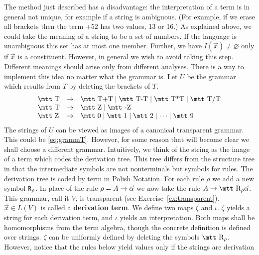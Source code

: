 The method just described has a disadvantage: the interpretation
of a term is in general not unique, for example if a string is
ambiguous. (For example, if we erase all brackets then the
term {+52} has two values, 13 or 16.) As explained
above, we could take the meaning of a string to be a set of numbers.
If the language is unambiguous this set has at most one member.
Further, we have $I(\vec{x}) \neq \varnothing$ only if $\vec{x}$
is a constituent. However, in general we wish to avoid taking this
step. Different meanings should arise only from different
analyses. There is a way to implement this idea no matter what the
grammar is. Let $U$ be the grammar which results from $T$ by
deleting the brackets of $T$.
\begin{equation}
\begin{array}{l@{\quad \pf\quad}l}
\mbox{\mtt T} & \mbox{\mtt T+T} \mid \mbox{\mtt T-T} \mid
    \mbox{\mtt T\symbol{42}T} \mid
    \mbox{\mtt T\symbol{47}T} \\
\mbox{\mtt T} & \mbox{\mtt Z} \mid \mbox{\mtt -Z} \\
\mbox{\mtt Z} & \mbox{\mtt 0} \mid \mbox{\mtt 1} \mid
    \mbox{\mtt 2} \mid \dotsb \mid \mbox{\mtt 9}
\end{array}
\end{equation}
The strings of $U$ can be viewed as images of a canonical transparent 
grammar. This could be \eqref{eq:grammT}. However, for some 
reason that will become clear we shall choose a different 
grammar. Intuitively, we think of the string as the image 
of a term which codes the derivation tree. This tree differs 
from the structure tree in that the intermediate symbols are 
not nonterminals but symbols for rules. The derivation tree 
is coded by term in Polish Notation. 
For each rule $\rho$ 
we add a new symbol $\mbox{\tt R}_{\rho}$. In place of the 
rule $\rho = A \rightarrow \vec{\alpha}$ we now take the rule
$A \pf \mbox{\mtt R}_{\rho} \vec{\alpha}$. This grammar,
call it $V$, is transparent (see Exercise~\ref{ex:transparent}). 
$\vec{x} \in L(V)$
is called a \textbf{derivation term}. 
We define two maps
$\zeta$ and $\iota$. $\zeta$ yields a string for each
derivation term, and $\iota$ yields an interpretation.
Both maps shall be homomorphisms from the
term algebra, though the concrete definition is defined
over strings. $\zeta$ can be uniformly defined by deleting
the symbols $\mbox{\mtt R}_{\rho}$. However, notice that the
rules below yield values only if the strings are derivation
